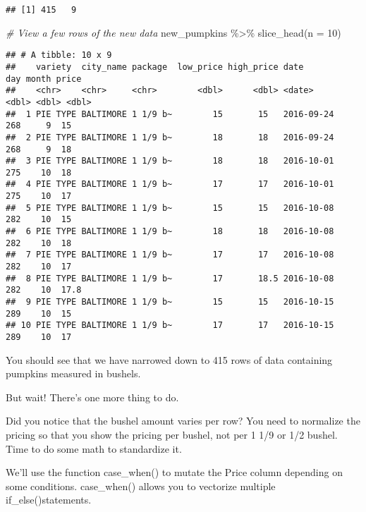 \documentclass[
]{article}
\newenvironment{Shaded}{\begin{snugshade}}{\end{snugshade}}
\newcommand{\AttributeTok}[1]{\textcolor[rgb]{0.77,0.63,0.00}{#1}}
\newcommand{\CommentTok}[1]{\textcolor[rgb]{0.56,0.35,0.01}{\textit{#1}}}
\newcommand{\DecValTok}[1]{\textcolor[rgb]{0.00,0.00,0.81}{#1}}
\newcommand{\FunctionTok}[1]{\textcolor[rgb]{0.00,0.00,0.00}{#1}}
\newcommand{\NormalTok}[1]{#1}
\newcommand{\SpecialCharTok}[1]{\textcolor[rgb]{0.00,0.00,0.00}{#1}}
\begin{document}
\begin{verbatim}
## [1] 415   9
\end{verbatim}

\begin{Shaded}
\begin{Highlighting}[]
\CommentTok{\# View a few rows of the new data}
\NormalTok{new\_pumpkins }\SpecialCharTok{\%\textgreater{}\%} 
  \FunctionTok{slice\_head}\NormalTok{(}\AttributeTok{n =} \DecValTok{10}\NormalTok{)}
\end{Highlighting}
\end{Shaded}

\begin{verbatim}
## # A tibble: 10 x 9
##    variety  city_name package  low_price high_price date         day month price
##    <chr>    <chr>     <chr>        <dbl>      <dbl> <date>     <dbl> <dbl> <dbl>
##  1 PIE TYPE BALTIMORE 1 1/9 b~        15       15   2016-09-24   268     9  15  
##  2 PIE TYPE BALTIMORE 1 1/9 b~        18       18   2016-09-24   268     9  18  
##  3 PIE TYPE BALTIMORE 1 1/9 b~        18       18   2016-10-01   275    10  18  
##  4 PIE TYPE BALTIMORE 1 1/9 b~        17       17   2016-10-01   275    10  17  
##  5 PIE TYPE BALTIMORE 1 1/9 b~        15       15   2016-10-08   282    10  15  
##  6 PIE TYPE BALTIMORE 1 1/9 b~        18       18   2016-10-08   282    10  18  
##  7 PIE TYPE BALTIMORE 1 1/9 b~        17       17   2016-10-08   282    10  17  
##  8 PIE TYPE BALTIMORE 1 1/9 b~        17       18.5 2016-10-08   282    10  17.8
##  9 PIE TYPE BALTIMORE 1 1/9 b~        15       15   2016-10-15   289    10  15  
## 10 PIE TYPE BALTIMORE 1 1/9 b~        17       17   2016-10-15   289    10  17
\end{verbatim}

You should see that we have narrowed down to 415 rows of data containing
pumpkins measured in bushels.

But wait! There's one more thing to do.

Did you notice that the bushel amount varies per row? You need to
normalize the pricing so that you show the pricing per bushel, not per 1
1/9 or 1/2 bushel. Time to do some math to standardize it.

We'll use the function case\_when() to mutate the Price column depending
on some conditions. case\_when() allows you to vectorize multiple
if\_else()statements.
\end{document}
